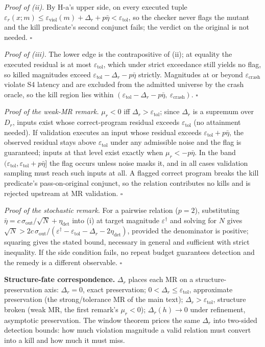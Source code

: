 \documentclass[manuscript,screen,review]{acmart}
\begin{document}
\emph{Proof of (ii).} By H-a's upper side, on every executed tuple
$\varepsilon_r(x; m) \leq \varepsilon_{\mathrm{viol}}(m) + \Delta_r + p\bar\eta < \varepsilon_{\mathrm{tol}}$,
so the checker never flags the mutant and the kill predicate's second
conjunct fails; the verdict on the original is not needed. $\square$

\emph{Proof of (iii).} The lower edge is the contrapositive of (ii); at
equality the executed residual is at most $\varepsilon_{\mathrm{tol}}$,
which under strict exceedance still yields no flag, so killed magnitudes
exceed
$\varepsilon_{\mathrm{tol}} - \Delta_r - p\bar\eta$
strictly. Magnitudes at or beyond $\varepsilon_{\mathrm{crash}}$ violate
S4 latency and are excluded from the admitted universe by the crash
oracle, so the kill region lies within
$(\varepsilon_{\mathrm{tol}} - \Delta_r - p\bar\eta,\ \varepsilon_{\mathrm{crash}})$.
$\square$

\emph{Proof of the weak-MR remark.} $\mu_r < 0$ iff
$\Delta_r > \varepsilon_{\mathrm{tol}}$; since $\Delta_r$ is a supremum
over $D_r$, inputs exist whose correct-program residual exceeds
$\varepsilon_{\mathrm{tol}}$ (no attainment needed). If validation
executes an input whose residual exceeds
$\varepsilon_{\mathrm{tol}} + p\bar\eta$, the observed residual stays
above $\varepsilon_{\mathrm{tol}}$ under any admissible noise and the
flag is guaranteed; inputs at that level exist exactly when
$\mu_r < -p\bar\eta$. In the band
$(\varepsilon_{\mathrm{tol}}, \varepsilon_{\mathrm{tol}} + p\bar\eta]$
the flag occurs unless noise masks it, and in all cases validation
sampling must reach such inputs at all. A flagged correct program
breaks the kill predicate's pass-on-original conjunct, so the relation
contributes no kills and is rejected upstream at MR validation.
$\square$

\emph{Proof of the stochastic remark.} For a pairwise relation
($p = 2$), substituting
$\bar\eta = c\,\sigma_{\mathrm{out}}/\sqrt{N} + \eta_{\mathrm{det}}$
into (i) at target magnitude $\varepsilon^\dagger$ and solving for $N$
gives
$\sqrt{N} > 2c\,\sigma_{\mathrm{out}}/(\varepsilon^\dagger - \varepsilon_{\mathrm{tol}} - \Delta_r - 2\eta_{\mathrm{det}})$,
provided the denominator is positive; squaring gives the stated bound,
necessary in general and sufficient with strict inequality. If the side
condition fails, no repeat budget guarantees detection and the remedy
is a different observable. $\square$

\textbf{Structure-fate correspondence.} $\Delta_r$ places each MR on a
structure-preservation axis: $\Delta_r = 0$, exact preservation;
$0 < \Delta_r \leq \varepsilon_{\mathrm{tol}}$, approximate
preservation (the strong/tolerance MR of the main text);
$\Delta_r > \varepsilon_{\mathrm{tol}}$, structure broken (weak MR, the
first remark's $\mu_r < 0$); $\Delta_r(h) \to 0$ under refinement,
asymptotic preservation. The window theorem prices the same $\Delta_r$
into two-sided detection bounds: how much violation magnitude a valid
relation must convert into a kill and how much it must miss.
\end{document}
